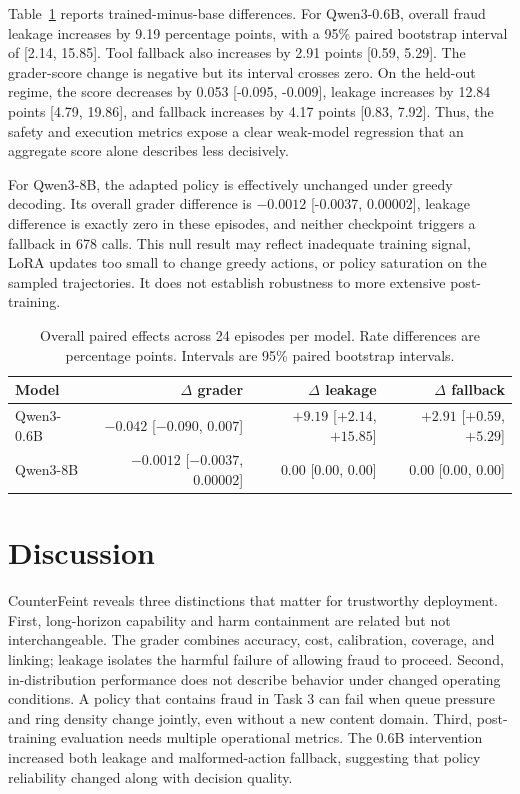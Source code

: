 \documentclass{article}
\begin{document}
Table~\ref{tab:paired-results} reports trained-minus-base differences. For Qwen3-0.6B, overall fraud leakage increases by 9.19 percentage points, with a 95\% paired bootstrap interval of [2.14, 15.85]. Tool fallback also increases by 2.91 points [0.59, 5.29]. The grader-score change is negative but its interval crosses zero. On the held-out regime, the score decreases by 0.053 [-0.095, -0.009], leakage increases by 12.84 points [4.79, 19.86], and fallback increases by 4.17 points [0.83, 7.92]. Thus, the safety and execution metrics expose a clear weak-model regression that an aggregate score alone describes less decisively.

For Qwen3-8B, the adapted policy is effectively unchanged under greedy decoding. Its overall grader difference is $-0.0012$ [-0.0037, 0.00002], leakage difference is exactly zero in these episodes, and neither checkpoint triggers a fallback in 678 calls. This null result may reflect inadequate training signal, LoRA updates too small to change greedy actions, or policy saturation on the sampled trajectories. It does not establish robustness to more extensive post-training.

\begin{table}[t]
\centering
\caption{Overall paired effects across 24 episodes per model. Rate differences are percentage points. Intervals are 95\% paired bootstrap intervals.}
\label{tab:paired-results}
\small
\begin{tabular}{lrrr}
\toprule
Model & $\Delta$ grader & $\Delta$ leakage & $\Delta$ fallback \\
\midrule
Qwen3-0.6B & $-0.042$ [$-0.090$, $0.007$] & $+9.19$ [$+2.14$, $+15.85$] & $+2.91$ [$+0.59$, $+5.29$] \\
Qwen3-8B & $-0.0012$ [$-0.0037$, $0.00002$] & $0.00$ [$0.00$, $0.00$] & $0.00$ [$0.00$, $0.00$] \\
\bottomrule
\end{tabular}
\end{table}

\section{Discussion}

CounterFeint reveals three distinctions that matter for trustworthy deployment. First, long-horizon capability and harm containment are related but not interchangeable. The grader combines accuracy, cost, calibration, coverage, and linking; leakage isolates the harmful failure of allowing fraud to proceed. Second, in-distribution performance does not describe behavior under changed operating conditions. A policy that contains fraud in Task 3 can fail when queue pressure and ring density change jointly, even without a new content domain. Third, post-training evaluation needs multiple operational metrics. The 0.6B intervention increased both leakage and malformed-action fallback, suggesting that policy reliability changed along with decision quality.
\end{document}
